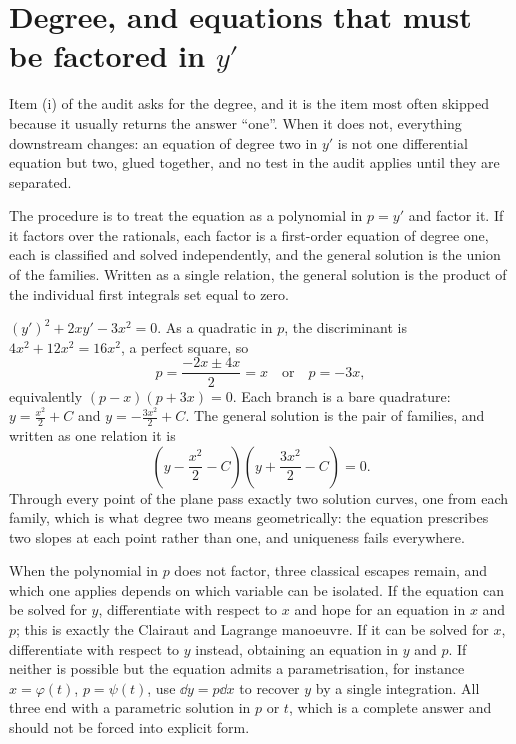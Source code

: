 \section{Degree, and equations that must be factored in $y'$}

Item (i) of the audit asks for the degree, and it is the item most often skipped because it usually returns the answer ``one''. When it does not, everything downstream changes: an equation of degree two in $y'$ is not one differential equation but two, glued together, and no test in the audit applies until they are separated.

The procedure is to treat the equation as a polynomial in $p=y'$ and factor it. If it factors over the rationals, each factor is a first-order equation of degree one, each is classified and solved independently, and the general solution is the union of the families. Written as a single relation, the general solution is the product of the individual first integrals set equal to zero.

\begin{worked}
$(y')^{2}+2xy'-3x^{2}=0$. As a quadratic in $p$, the discriminant is $4x^{2}+12x^{2}=16x^{2}$, a perfect square, so
\[p=\frac{-2x\pm4x}{2}=x\quad\text{or}\quad p=-3x,\]
equivalently $(p-x)(p+3x)=0$. Each branch is a bare quadrature: $y=\tfrac{x^{2}}{2}+C$ and $y=-\tfrac{3x^{2}}{2}+C$. The general solution is the pair of families, and written as one relation it is
\[\left(y-\frac{x^{2}}{2}-C\right)\left(y+\frac{3x^{2}}{2}-C\right)=0.\]
Through every point of the plane pass exactly two solution curves, one from each family, which is what degree two means geometrically: the equation prescribes two slopes at each point rather than one, and uniqueness fails everywhere.
\end{worked}

When the polynomial in $p$ does not factor, three classical escapes remain, and which one applies depends on which variable can be isolated. If the equation can be solved for $y$, differentiate with respect to $x$ and hope for an equation in $x$ and $p$; this is exactly the Clairaut and Lagrange manoeuvre. If it can be solved for $x$, differentiate with respect to $y$ instead, obtaining an equation in $y$ and $p$. If neither is possible but the equation admits a parametrisation, for instance $x=\varphi(t)$, $p=\psi(t)$, use $\dd y=p\dd x$ to recover $y$ by a single integration. All three end with a parametric solution in $p$ or $t$, which is a complete answer and should not be forced into explicit form.

